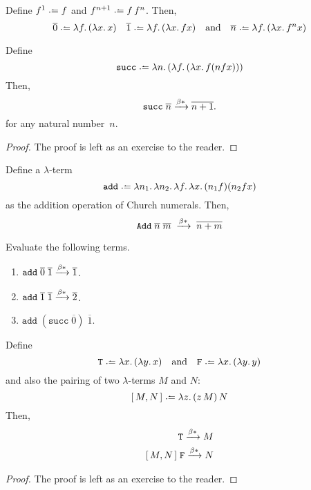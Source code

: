 \begin{definition}
  Define $f^1 \defeq f$ and $f^{n+1} \defeq f\,f^n$. Then, 
  \[
    \overline{0} \defeq \lambda f.\, (\lambda x.\, x)
    \quad
    \overline{1} \defeq \lambda f.\, (\lambda x.\, f x)
    \quad\text{and}\quad
    \overline{n} \defeq \lambda f.\, (\lambda x.\, f^{n} x)
  \] 
\end{definition}

\begin{definition}[Successor]
  Define
  \[
    \mathtt{succ} \defeq \lambda n.\, (\lambda f.\, (\lambda x.\, f(n f x)))
  \]
  Then,
  \[
    \mathtt{succ}\;\overline{n} \xrightarrow{\beta*} \overline{n+1}.
  \]
  for any natural number~$n$.
\end{definition}
\begin{proof}
  The proof is left as an exercise to the reader.
\end{proof}
\begin{proposition}[Addition]
  Define a $\lambda$-term 
  \[
    \mathtt{add} \defeq \lambda n_1.\,\lambda n_2.\, \lambda f.\,\lambda x.\,
    (n_1 f)(n_2 fx)
  \]
  as the addition operation of Church numerals.
  Then, 
  \[
    \mathtt{Add}\;\overline{n}\;\overline{m}\;
    \xrightarrow{\beta*}\;\overline{n + m}
  \]
\end{proposition}
\begin{example}
  Evaluate the following terms.
  \begin{enumerate}
    \item $\mathtt{add}\;\overline{0}\;\overline{1}
      \xrightarrow{\beta*} \overline{1}$.
    \item $\mathtt{add}\;\overline{1}\;\overline{1}
      \xrightarrow{\beta*} \overline{2}$.
    \item $\mathtt{add}\;(\mathtt{succ}\;\overline{0})\;\overline{1}$.
    \end{enumerate}
\end{example}
\begin{proposition}
  Define 
  \[
    \mathtt{T} \defeq \lambda x.\,(\lambda y.\, x)
    \quad\text{and}\quad
    \mathtt{F} \defeq \lambda x.\,(\lambda y.\, y)
  \]
  and also the pairing of two $\lambda$-terms $M$ and $N$:
  \[
    [\,M, N\,] \defeq \lambda z.\, (z\,M)\,N
  \]
  Then, 
  \begin{align*}
    [\,M, N\,]\;\mathtt{T} \reduce M \\
    [\,M, N\,]\;\mathtt{F} \reduce N
  \end{align*}
\end{proposition}
\begin{proof}
  The proof is left as an exercise to the reader.
\end{proof}

